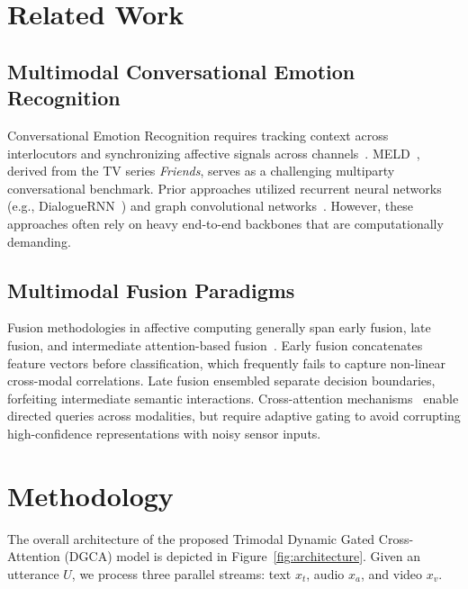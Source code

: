 \documentclass[10pt,twocolumn,letterpaper]{article}
\begin{document}
\section{Related Work}
\label{sec:related_work}

\subsection{Multimodal Conversational Emotion Recognition}
Conversational Emotion Recognition requires tracking context across interlocutors and synchronizing affective signals across channels~\cite{ghosal2019dialoguegcn}. MELD~\cite{poria2019meld}, derived from the TV series \textit{Friends}, serves as a challenging multiparty conversational benchmark. Prior approaches utilized recurrent neural networks (e.g., DialogueRNN~\cite{majumder2019dialoguernn}) and graph convolutional networks~\cite{ghosal2019dialoguegcn, shen2021dialogxl}. However, these approaches often rely on heavy end-to-end backbones that are computationally demanding.

\subsection{Multimodal Fusion Paradigms}
Fusion methodologies in affective computing generally span early fusion, late fusion, and intermediate attention-based fusion~\cite{baltruvsaitis2018multimodal}. Early fusion concatenates feature vectors before classification, which frequently fails to capture non-linear cross-modal correlations. Late fusion ensembled separate decision boundaries, forfeiting intermediate semantic interactions. Cross-attention mechanisms~\cite{tsai2019multimodal} enable directed queries across modalities, but require adaptive gating to avoid corrupting high-confidence representations with noisy sensor inputs.

\section{Methodology}
\label{sec:methodology}

The overall architecture of the proposed Trimodal Dynamic Gated Cross-Attention (DGCA) model is depicted in Figure~\ref{fig:architecture}. Given an utterance $U$, we process three parallel streams: text $x_t$, audio $x_a$, and video $x_v$.
\end{document}

